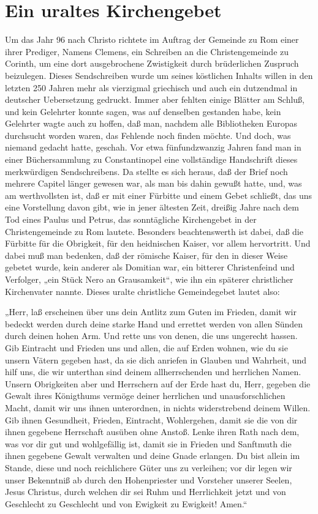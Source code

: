 \chapter{Ein uraltes Kirchengebet}

Um das Jahr 96 nach Christo richtete im Auftrag der Gemeinde zu Rom einer ihrer Prediger, Namens Clemens, ein Schreiben an die Christengemeinde zu Corinth, um eine dort ausgebrochene Zwistigkeit durch brüderlichen Zuspruch beizulegen. Dieses Sendschreiben wurde um seines köstlichen Inhalts willen in den letzten 250 Jahren mehr als vierzigmal griechisch und auch ein dutzendmal in deutscher Uebersetzung gedruckt. Immer aber fehlten einige Blätter am Schluß, und kein Gelehrter konnte sagen, was auf denselben gestanden habe, kein Gelehrter wagte auch zu hoffen, daß man, nachdem alle Bibliotheken Europas durchsucht worden waren, das Fehlende noch finden möchte. Und doch, was niemand gedacht hatte, geschah. Vor etwa fünfundzwanzig Jahren fand man in einer Büchersammlung zu Constantinopel eine vollständige Handschrift dieses merkwürdigen Sendschreibens. Da stellte es sich heraus, daß der Brief noch mehrere Capitel länger gewesen war, als man bis dahin gewußt hatte, und, was am werthvollsten ist, daß er mit einer Fürbitte und einem Gebet schließt, das uns eine Vorstellung davon gibt, wie in jener ältesten Zeit, dreißig Jahre nach dem Tod eines Paulus und Petrus, das sonntägliche Kirchengebet in der Christengemeinde zu Rom lautete. Besonders beachtenswerth ist dabei, daß die Fürbitte für die Obrigkeit, für den heidnischen Kaiser, vor allem hervortritt. Und dabei muß man bedenken, daß der römische Kaiser, für den in dieser Weise gebetet wurde, kein anderer als Domitian war, ein bitterer Christenfeind und Verfolger, „ein Stück Nero an Grausamkeit“, wie ihn ein späterer christlicher Kirchenvater nannte. Dieses uralte christliche Gemeindegebet lautet also:

„Herr, laß erscheinen über uns dein Antlitz zum Guten im Frieden, damit wir bedeckt werden durch deine starke Hand und errettet werden von allen Sünden durch deinen hohen Arm. Und rette uns von denen, die uns ungerecht hassen. Gib Eintracht und Frieden uns und allen, die auf Erden wohnen, wie du sie unsern Vätern gegeben hast, da sie dich anriefen in Glauben und Wahrheit, und hilf uns, die wir unterthan sind deinem allherrschenden und herrlichen Namen. Unsern Obrigkeiten aber und Herrschern auf der Erde hast du, Herr, gegeben die Gewalt ihres Königthums vermöge deiner herrlichen und unausforschlichen Macht, damit wir uns ihnen unterordnen, in nichts widerstrebend deinem Willen.
Gib ihnen Gesundheit, Frieden, Eintracht, Wohlergehen, damit sie die von dir ihnen gegebene Herrschaft ausüben ohne Anstoß. Lenke ihren Rath nach dem, was vor dir gut und wohlgefällig ist, damit sie in Frieden und Sanftmuth die ihnen gegebene Gewalt verwalten und deine Gnade erlangen. Du bist allein im Stande, diese und noch reichlichere Güter uns zu verleihen; vor dir legen wir unser Bekenntniß ab durch den Hohenpriester und Vorsteher unserer Seelen, Jesus Christus, durch welchen dir sei Ruhm und Herrlichkeit jetzt und von Geschlecht zu Geschlecht und von Ewigkeit zu Ewigkeit! Amen.“

